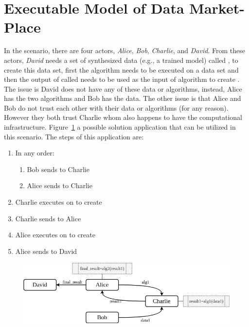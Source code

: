 \section{Executable Model of Data Market-Place}
In the scenario, there are four actors, \textit{Alice}, \textit{Bob}, \textit{Charlie}, and \textit{David}. From these actors, \textit{David} needs a set of synthesized data (e.g., a trained model) called , to create this data set, first the algorithm  needs to be executed on a data set  and then the output of  called  needs to be used as the input of algorithm  to create . The issue is David does not have any of these data or algorithms, instead, Alice has the two algorithms and Bob has the data. The other issue is that Alice and Bob do not trust each other with their data or algorithms (for any reason). However they both trust Charlie whom also happens to have the computational infrastructure. Figure~\ref{fig:dmp-example} a possible solution application that can be utilized in this scenario. The steps of this application are: 
\begin{enumerate}
    \item In any order:
    \begin{enumerate}
        \item Bob sends  to Charlie
        \item Alice sends  to Charlie
    \end{enumerate}
    \item Charlie executes  on  to create 
    \item Charlie sends  to Alice
    \item Alice executes  on  to create 
    \item Alice sends  to David
\end{enumerate}


\begin{figure}[t]
\centering
\begin{minipage}[b]{.9\linewidth}
  \centering
  \includegraphics[width=\textwidth]{ch_cmf/market-example.drawio.png}
  \label{fig:dmp-example}
\end{minipage}
\end{figure}

